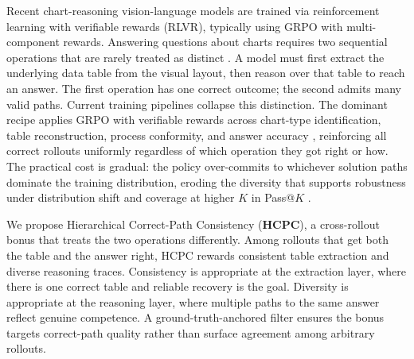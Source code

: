 \documentclass[11pt]{article}
\begin{document}
Recent chart-reasoning vision-language models are trained via
reinforcement learning with verifiable rewards (RLVR), typically using GRPO with
multi-component rewards.
Answering questions about charts requires two sequential operations
that are rarely treated as distinct \citep{chartrvr2025,chartr12025,bigcharts2025,distill-vcr-2025}. A model must first extract the
underlying data table from the visual layout, then reason over that
table to reach an answer. The first operation has one correct
outcome; the second admits many valid paths. Current training
pipelines collapse this distinction. The dominant recipe applies
GRPO \citep{deepseekmath} with verifiable rewards across chart-type
identification, table reconstruction, process conformity, and answer
accuracy \citep{chartrvr2025,chartr12025,bigcharts2025,
distill-vcr-2025}, reinforcing all correct rollouts uniformly
regardless of which operation they got right or how. The practical
cost is gradual: the policy over-commits to whichever solution paths
dominate the training distribution, eroding the diversity that
supports robustness under distribution shift and coverage at higher
$K$ in Pass@$K$ \citep{passatk}.

We propose Hierarchical Correct-Path Consistency (\textbf{HCPC}),
a cross-rollout bonus that treats the two operations differently.
Among rollouts that get both the table and the answer right, HCPC
rewards consistent table extraction and diverse reasoning traces.
Consistency is appropriate at the extraction layer, where there is
one correct table and reliable recovery is the goal. Diversity is
appropriate at the reasoning layer, where multiple paths to the same
answer reflect genuine competence. A ground-truth-anchored filter
ensures the bonus targets correct-path quality rather than surface
agreement among arbitrary rollouts.
\end{document}

